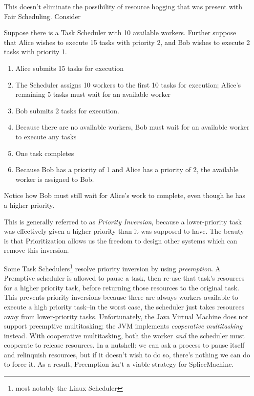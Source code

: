 This doesn't eliminate the possibility of resource hogging that was present with Fair Scheduling. Consider

\begin{exmp}
Suppose there is a Task Scheduler with 10 available workers. Further suppose that Alice wishes to execute 15 tasks with priority 2, and Bob wishes to execute 2 tasks with priority 1.

\begin{enumerate}
\item Alice submits 15 tasks for execution
\item The Scheduler assigns 10 workers to the first 10 tasks for execution; Alice's remaining 5 tasks must wait for an available worker
\item Bob submits 2 tasks for execution. 
\item Because there are no available workers, Bob must wait for an available worker to execute any tasks
\item One task completes
\item Because Bob has a priority of 1 and Alice has a priority of 2, the available worker is assigned to Bob.
\end{enumerate}
Notice how Bob must still wait for Alice's work to complete, even though he has a higher priority.
\end{exmp}

This is generally referred to as \emph{Priority Inversion}, because a lower-priority task was effectively given a higher priority than it was supposed to have. The beauty is that Prioritization allows us the freedom to design other systems which can remove this inversion.

Some Task Schedulers\footnote{most notably the Linux Scheduler} resolve priority inversion by using \emph{preemption}. A Premptive scheduler is allowed to pause a task, then re-use that task's resources for a higher priority task, before returning those resources to the original task. This prevents priority inversions because there are always workers available to execute a high priority task--in the worst case, the scheduler just takes resources away from lower-priority tasks. Unfortunately, the Java Virtual Machine does not support preemptive multitasking; the JVM implements \emph{cooperative multitasking} instead. With cooperative multitasking, both the worker \emph{and} the scheduler must cooperate to release resources. In a nutshell: we can ask a process to pause itself and relinquish resources, but if it doesn't wish to do so, there's nothing we can do to force it. As a result, Preemption isn't a viable strategy for SpliceMachine.

